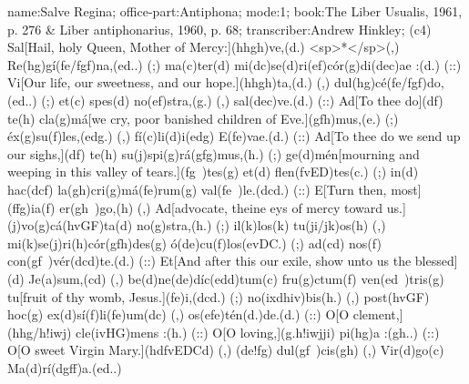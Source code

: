 name:Salve Regina;
office-part:Antiphona;
mode:1;
book:The Liber Usualis, 1961, p. 276 & Liber antiphonarius, 1960, p. 68;
transcriber:Andrew Hinkley;
(c4) Sal[Hail, holy Queen, Mother of Mercy:](hhgh)ve,(d.) <sp>*</sp>(,) Re(hg)gí(fe/fgf)na,(ed..) (;) ma(c)ter(d) mi(dc)se(d)ri(ef)cór(g)di(dec)ae :(d.) (::) Vi[Our life, our sweetness, and our hope.](hhgh)ta,(d.) (,) dul(hg)cé(fe/fgf)do,(ed..) (;) et(c) spes(d) no(ef)stra,(g.) (,) sal(dec)ve.(d.) (::) Ad[To thee do](df) te(h) cla(g)má[we cry, poor banished children of Eve.](gfh)mus,(e.) (;) éx(g)su(f)les,(edg.) (,) fí(c)li(d)i(edg) E(fe)vae.(d.) (::) Ad[To thee do we send up our sighs,](df) te(h) su(j)spi(g)rá(gfg)mus,(h.) (;) ge(d)mén[mourning and weeping in this valley of tears.](fg~)tes(g) et(d) flen(fvED)tes(c.) (;) in(d) hac(dcf) la(gh)cri(g)má(fe)rum(g) val(fe~)le.(dcd.) (::) E[Turn then, most](ffg)ia(f) er(gh~)go,(h) (,) Ad[advocate, theine eys of mercy toward us.](j)vo(g)cá(hvGF)ta(d) no(g)stra,(h.) (;) il(k)los(k) tu(ji/jk)os(h) (,) mi(k)se(j)ri(h)cór(gfh)des(g) ó(de)cu(f)los(evDC.) (;) ad(cd) nos(f) con(gf~)vér(dcd)te.(d.) (::) Et[And after this our exile, show unto us the blessed](d) Je(a)sum,(cd) (,) be(d)ne(de)díc(edd)tum(c) fru(g)ctum(f) ven(ed~)tris(g) tu[fruit of thy womb, Jesus.](fe)i,(dcd.) (;) no(ixdhiv)bis(h.) (,) post(hvGF) hoc(g) ex(d)sí(f)li(fe)um(dc) (,) os(efe)tén(d.)de.(d.) (::) O[O clement,](hhg/h!iwj) cle(ivHG)mens :(h.) (::) O[O loving,](g.h!iwjji) pi(hg)a :(gh..) (::) O[O sweet Virgin Mary.](hdfvEDCd) (,) (de!fg) dul(gf~)cis(gh) (,) Vir(d)go(c) Ma(d)rí(dgff)a.(ed..)